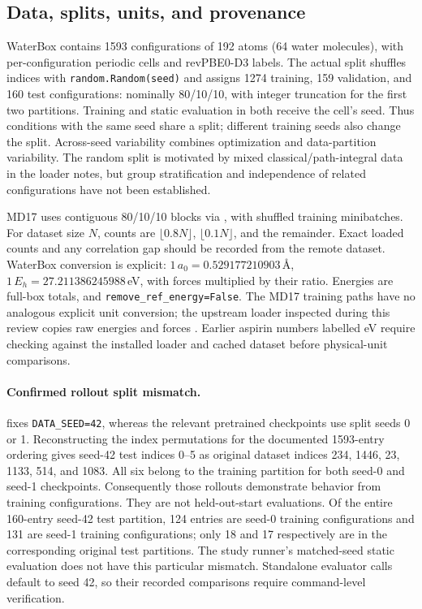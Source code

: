 \documentclass[11pt]{article}
\begin{document}
\subsection{Data, splits, units, and provenance}

WaterBox contains 1593 configurations of 192 atoms (64 water molecules),
with per-configuration periodic cells and revPBE0-D3 labels. The actual
 split shuffles indices with
\texttt{random.Random(seed)} and assigns 1274 training, 159 validation,
and 160 test configurations: nominally 80/10/10, with integer truncation
for the first two partitions. Training and static evaluation in
 both receive the cell's seed. Thus
conditions with the same seed share a split; different training seeds also
change the split. Across-seed variability combines optimization and
data-partition variability. The random split is motivated by mixed
classical/path-integral data in the loader notes, but group stratification
and independence of related configurations have not been established.

MD17 uses contiguous 80/10/10 blocks via
, with shuffled training minibatches. For dataset
size $N$, counts are $\lfloor0.8N\rfloor$, $\lfloor0.1N\rfloor$, and
the remainder. Exact loaded counts and any correlation gap should be
recorded from the remote dataset. WaterBox conversion is explicit:
$1\,a_0=0.529177210903$\,\AA,
$1\,E_h=27.211386245988$\,eV, with forces multiplied by their ratio.
Energies are full-box totals, and \texttt{remove\_ref\_energy=False}.
The MD17 training paths have no analogous explicit unit conversion;
the upstream loader inspected during this review copies raw energies and
forces \citep{torchmdnet-review-source}. Earlier aspirin numbers labelled eV require checking against the
installed loader and cached dataset before physical-unit comparisons.

\paragraph{Confirmed rollout split mismatch.}
 fixes \texttt{DATA\_SEED=42}, whereas
the relevant pretrained checkpoints use split seeds 0 or 1. Reconstructing
the index permutations for the documented 1593-entry ordering gives
seed-42 test indices 0--5 as original dataset indices
234, 1446, 23, 1133, 514, and 1083. All six belong to the training
partition for both seed-0 and seed-1 checkpoints. Consequently those
rollouts demonstrate behavior from training configurations. They are not
held-out-start evaluations. Of the entire 160-entry seed-42 test partition,
124 entries are seed-0 training configurations and 131 are seed-1 training
configurations; only 18 and 17 respectively are in the corresponding
original test partitions. The study runner's matched-seed static evaluation
does not have this particular mismatch. Standalone evaluator calls default
to seed 42, so their recorded comparisons require command-level verification.
\end{document}
